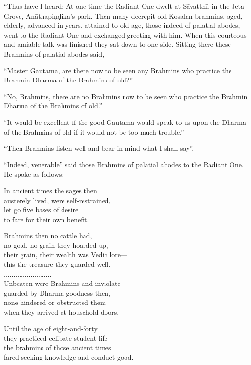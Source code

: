 \begin{myquote}
“Thus have I heard: At one time the Radiant One dwelt at Sāvatthī, in the Jeta Grove, Anāthapiṇḍika’s park. Then many decrepit old Kosalan brahmins, aged, elderly, advanced in years, attained to old age, those indeed of palatial abodes, went to the Radiant One and exchanged greeting with him. When this courteous and amiable talk was finished they sat down to one side. Sitting there these Brahmins of palatial abodes said,

“Master Gautama, are there now to be seen any Brahmins who practice the Brahmin Dharma of the Brahmins of old?”

“No, Brahmins, there are no Brahmins now to be seen who practice the Brahmin Dharma of the Brahmins of old.”

“It would be excellent if the good Gautama would speak to us upon the Dharma of the Brahmins of old if it would not be too much trouble.”

“Then Brahmins listen well and bear in mind what I shall say”.

“Indeed, venerable” said those Brahmins of palatial abodes to the Radiant One. He spoke as follows:

In ancient times the sages then\\ austerely lived, were self-restrained,\\ let go five bases of desire\\ to fare for their own benefit.

Brahmins then no cattle had,\\ no gold, no grain they hoarded up,\\ their grain, their wealth was Vedic lore—\\ this the treasure they guarded well.\\.........................\\ Unbeaten were Brahmins and inviolate—\\ guarded by Dharma-goodness then,\\ none hindered or obstructed them\\ when they arrived at household doors.

Until the age of eight-and-forty\\ they practiced celibate student life—\\ the brahmins of those ancient times\\ fared seeking knowledge and conduct good.


\end{myquote}

